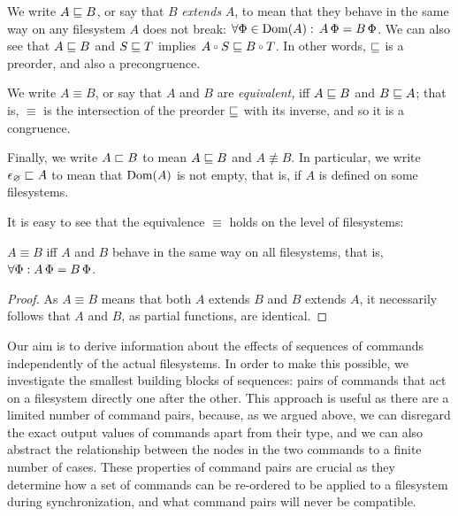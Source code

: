 \begin{mydef}
We write $A\sqsubseteq B$, or say that $B$ \emph{extends} $A$,
to mean that they behave in the same way
on any filesystem $A$ does not break:
$\forall \Phi\in\textrm{Dom}({A}):\,A\,\Phi=B\,\Phi$.
We can also see that $A\sqsubseteq B$ and $S\sqsubseteq T$ implies $A\cc S\eqext B\cc T$.
In other words, $\sqsubseteq$ is a preorder, and also a precongruence. %

We write $A\equiv B$,
or say that $A$ and $B$ are \emph{equivalent,}
iff $A\sqsubseteq B$ and $B\sqsubseteq A$;
that is, $\equiv$ is the intersection of the preorder $\sqsubseteq$ with its inverse,
and so it is a congruence. %

Finally, we write $A\sqsubset B$ to mean $A\sqsubseteq B$ and $A\nequiv B$.
In particular, we write $\epsilon_\varnothing\sqsubset{A}$
to mean that $\textrm{Dom}({A})$ is not empty, that is, if $A$ is defined on some filesystems.
\end{mydef}

It is easy to see that the equivalence $\equiv$ holds on the level of filesystems:
\begin{mylem}
$A\equiv B$
iff $A$ and $B$ behave in the same way on
all filesystems, that is, $\forall \Phi: A\,\Phi=B\,\Phi$.
\end{mylem}
\begin{proof}
As $A\equiv B$ means that both $A$ extends $B$ and $B$ extends $A$, it necessarily
follows that $A$ and $B$, as partial functions, are identical.
\end{proof}


\myskip
Our aim is to derive information about the effects of sequences
of commands independently of the actual filesystems.
In order to make this possible, we investigate the smallest building
blocks of sequences: pairs of commands that act on a filesystem directly one after the other.
This approach is useful as there are a limited number of command pairs,
because, as we argued above, we can disregard the exact output values of commands apart from their type,
and we can also abstract the relationship between the nodes in the two commands
to a finite number of cases.
These properties of command pairs are crucial as they determine
how a set of commands can be re-ordered to be applied to a filesystem
during synchronization, and what command pairs will never be compatible.

